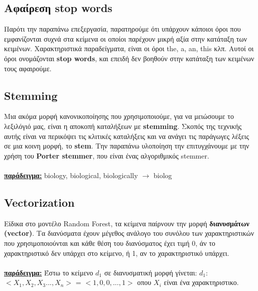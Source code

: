 \documentclass[12pt]{article}
\begin{document}
\subsection{Αφαίρεση stop words}
Παρότι την παραπάνω επεξεργασία, παρατηρούμε ότι υπάρχουν κάποιοι όροι που εμφανίζονται συχνά στα κείμενα οι οποίοι παρέχουν μικρή αξία στην κατάταξη των κειμένων. Χαρακτηριστικά παραδείγματα, είναι οι όροι the, a, an, this κλπ. Αυτοί οι όροι ονομάζονται \textbf{stop words}, και επειδή δεν βοηθούν στην κατάταξη των κειμένων τους αφαιρούμε.\\

\subsection{Stemming}
Mια ακόμα μορφή κανονικοποίησης που χρησιμοποιούμε, για να μειώσουμε το λεξιλόγιό μας, είναι η αποκοπή καταλήξεων με \textbf{stemming}. Σκοπός της τεχνικής αυτής είναι να περικόψει τις κλιτικές καταλήξεις και να ανάγει τις παράγωγες λέξεις σε μια κοινη μορφή, το \textbf{stem}. Την παραπάνω υλοποίηση την επιτυγχάνουμε με την χρήση του \textbf{Porter stemmer}, που είναι ένας αλγοριθμικός stemmer.\\\\
\underline{\textbf{παράδειγμα:}} biology, biological, biologically $\rightarrow$ biolog

\subsection{Vectorization}
Είδικα στο μοντέλο Random Forest, τα κείμενα παίρνουν την μορφή \textbf{διανυσμάτων (vector)}. Τα διανύσματα έχουν μέγεθος ανάλογο του συνόλου των χαρακτηριστικών που χρησιμοποιούνται και κάθε θέση του διανύσματος έχει τιμή 0, άν το χαρακτηριστικό δεν υπάρχει στο κείμενο, ή 1, αν το χαρακτηριστικό υπάρχει.\\\\
\underline{\textbf{παράδειγμα:}} Έστω το κείμενο $d_{1}$ σε διανυσματική μορφή γίνεται: $d_{1}$: $<X_{1}, X_{2}, X_{3} ..., X_{n}>$ = $<1, 0, 0, ..., 1>$ οπου $X_{i}$ είναι ένα χαρακτηριστικο. 

\end{document}

